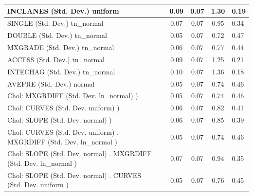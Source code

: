 \begin{table}
\begin{center}
\begin{tabular}{|l|l|c|c|c|l|}
			INCLANES (Std. Dev.) uniform &  & 0.09 & 0.07 & 1.30 & 0.19 \\
			\hline
			SINGLE (Std. Dev.) tn_normal &  & 0.07 & 0.07 & 0.95 & 0.34 \\
			\hline
			DOUBLE (Std. Dev.) tn_normal &  & 0.05 & 0.07 & 0.72 & 0.47 \\
			\hline
			MXGRADE (Std. Dev.) tn_normal &  & 0.06 & 0.07 & 0.77 & 0.44 \\
			\hline
			ACCESS (Std. Dev.) tn_normal &  & 0.09 & 0.07 & 1.25 & 0.21 \\
			\hline
			INTECHAG (Std. Dev.) tn_normal &  & 0.10 & 0.07 & 1.36 & 0.18 \\
			\hline
			AVEPRE (Std. Dev.) normal &  & 0.05 & 0.07 & 0.74 & 0.46 \\
			\hline
			 Chol: MXGRDIFF (Std. Dev. ln_normal) ) &  & 0.05 & 0.07 & 0.74 & 0.46 \\
			\hline
			 Chol: CURVES (Std. Dev. uniform) ) &  & 0.06 & 0.07 & 0.82 & 0.41 \\
			\hline
			 Chol: SLOPE (Std. Dev. normal) ) &  & 0.06 & 0.07 & 0.85 & 0.39 \\
			\hline
			 Chol: CURVES (Std. Dev. uniform) . MXGRDIFF (Std. Dev.   ln_normal ) &  & 0.05 & 0.07 & 0.74 & 0.46 \\
			\hline
			 Chol: SLOPE (Std. Dev. normal) . MXGRDIFF (Std. Dev.   ln_normal ) &  & 0.07 & 0.07 & 0.94 & 0.35 \\
			\hline
			 Chol: SLOPE (Std. Dev. normal) . CURVES (Std. Dev.   uniform ) &  & 0.05 & 0.07 & 0.76 & 0.45 \\
			\hline
		\end{tabular}
	\end{center}
\end{table}